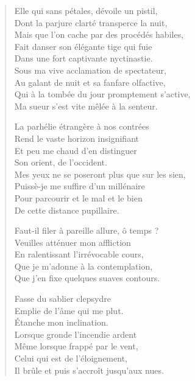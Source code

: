 \begin{verse}
Elle qui sans pétales, dévoile un pistil,\\
Dont la parjure clarté transperce la nuit,\\
Mais que l’on cache par des procédés habiles,\\
Fait danser son élégante tige qui fuie\\
Dans une fort captivante nyctinastie.\\
Sous ma vive acclamation de spectateur,\\
Au galant de nuit et sa fanfare olfactive,\\
Qui à la tombée du jour promptement s’active,\\
Ma sueur s’est vite mêlée à la senteur.

La parhélie étrangère à nos contrées\\
Rend le vaste horizon insignifiant\\
Et peu me chaud d’en distinguer\\
Son orient, de l’occident.\\
Mes yeux ne se poseront plus que sur les sien,\\
Puissè-je me suffire d’un millénaire\\
Pour parcourir et le mal et le bien\\
De cette distance pupillaire.%
%

Faut-il filer à pareille allure, ô temps ?\\
Veuilles atténuer mon affliction\\
En ralentissant l’irrévocable cours,\\
Que je m’adonne à la contemplation,\\
Que j’en fixe quelques suaves contours.

Fasse du sablier clepsydre\\
Emplie de l’âme qui me plut.\\
Étanche mon inclination.\\
Lorsque gronde l’incendie ardent\\
Même lorsque frappé par le vent,\\
Celui qui est de l’éloignement,\\
Il brûle et puis s’accroît jusqu’aux nues.


\end{verse}

